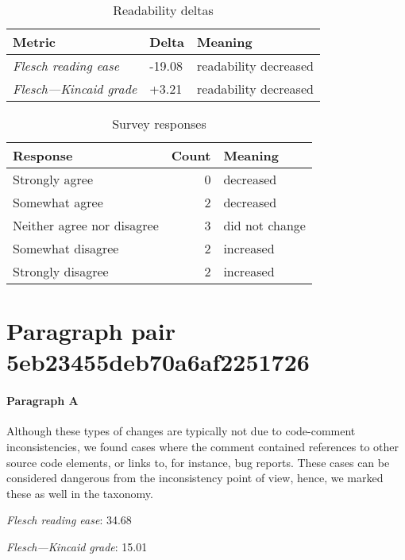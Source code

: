 \bigskip\begin{table}[!h]
\centering
\begin{tabular}{lll}
\toprule
               \textbf{Metric} & \textbf{Delta} &       \textbf{Meaning} \\
\midrule
    \emph{Flesch reading ease} &         -19.08 &  readability decreased \\
 \emph{Flesch---Kincaid grade} &          +3.21 &  readability decreased \\
\bottomrule
\end{tabular}
\caption*{Readability deltas}\end{table}

\begin{table}[!h]
\centering
\begin{tabular}{lrl}
\toprule
          \textbf{Response} &  \textbf{Count} & \textbf{Meaning} \\
\midrule
             Strongly agree &               0 &        decreased \\
             Somewhat agree &               2 &        decreased \\
 Neither agree nor disagree &               3 &   did not change \\
          Somewhat disagree &               2 &        increased \\
          Strongly disagree &               2 &        increased \\
\bottomrule
\end{tabular}
\caption*{Survey responses}\end{table}


\newpage
\section{Paragraph pair 5eb23455deb70a6af2251726}
\paragraph{Paragraph A}
Although these types of changes are typically not due to code-comment inconsistencies, we found cases where the comment contained references to other source code elements, or links to, for instance, bug reports. These cases can be considered dangerous from the inconsistency point of view, hence, we marked these as well in the taxonomy.\par\medskip
\emph{Flesch reading ease}: 34.68\par
\emph{Flesch---Kincaid grade}: 15.01

